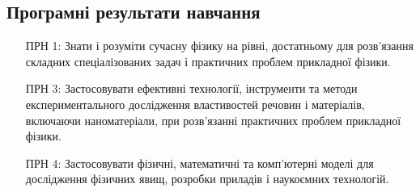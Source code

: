 \documentclass{Syllabus}
\begin{document}
\subsection*{Програмні результати навчання}

\begin{enumerate}
\item [ПРН 1:] Знати і розуміти сучасну фізику на рівні, достатньому для розв’язання складних спеціалізованих задач і практичних проблем прикладної фізики.
\item [ПРН 3:] Застосовувати ефективні технології, інструменти та методи експериментального дослідження властивостей речовин і матеріалів, включаючи наноматеріали, при розв’язанні практичних проблем прикладної фізики.
\item [ПРН 4:] Застосовувати фізичні, математичні та комп'ютерні моделі для дослідження фізичних явищ, розробки приладів і наукоємних технологій.

\end{enumerate}
\end{document}

